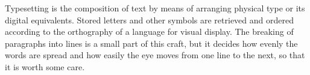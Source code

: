 \documentclass{scrartcl}
\begin{document}
\thispagestyle{plain}
Typesetting is the composition of text by means of arranging physical type or its digital equivalents. Stored letters and other symbols are retrieved and ordered according to the orthography of a language for visual display.
\newpage
The breaking of paragraphs into lines is a small part of this craft, but it decides how evenly the words are spread and how easily the eye moves from one line to the next, so that it is worth some care.
\end{document}

